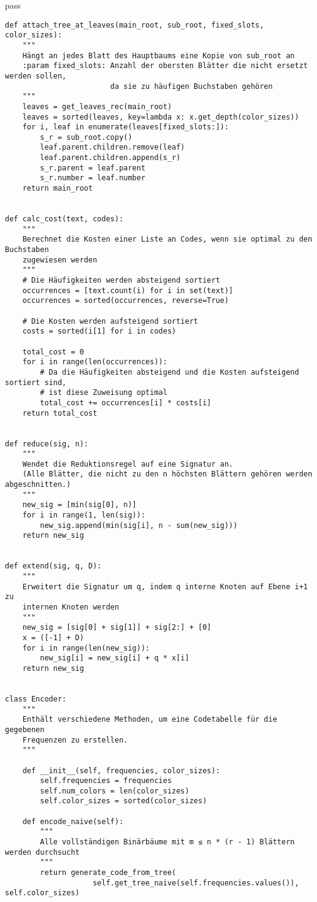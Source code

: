 pass\documentclass[a4paper,10pt,ngerman]{scrartcl}
\begin{document}
\begin{verbatim}
def attach_tree_at_leaves(main_root, sub_root, fixed_slots, color_sizes):
    """
    Hängt an jedes Blatt des Hauptbaums eine Kopie von sub_root an
    :param fixed_slots: Anzahl der obersten Blätter die nicht ersetzt werden sollen,
                        da sie zu häufigen Buchstaben gehören
    """
    leaves = get_leaves_rec(main_root)
    leaves = sorted(leaves, key=lambda x: x.get_depth(color_sizes))
    for i, leaf in enumerate(leaves[fixed_slots:]):
        s_r = sub_root.copy()
        leaf.parent.children.remove(leaf)
        leaf.parent.children.append(s_r)
        s_r.parent = leaf.parent
        s_r.number = leaf.number
    return main_root


def calc_cost(text, codes):
    """
    Berechnet die Kosten einer Liste an Codes, wenn sie optimal zu den Buchstaben
    zugewiesen werden
    """
    # Die Häufigkeiten werden absteigend sortiert
    occurrences = [text.count(i) for i in set(text)]
    occurrences = sorted(occurrences, reverse=True)

    # Die Kosten werden aufsteigend sortiert
    costs = sorted(i[1] for i in codes)

    total_cost = 0
    for i in range(len(occurrences)):
        # Da die Häufigkeiten absteigend und die Kosten aufsteigend sortiert sind,
        # ist diese Zuweisung optimal
        total_cost += occurrences[i] * costs[i]
    return total_cost


def reduce(sig, n):
    """
    Wendet die Reduktionsregel auf eine Signatur an.
    (Alle Blätter, die nicht zu den n höchsten Blättern gehören werden abgeschnitten.)
    """
    new_sig = [min(sig[0], n)]
    for i in range(1, len(sig)):
        new_sig.append(min(sig[i], n - sum(new_sig)))
    return new_sig


def extend(sig, q, D):
    """
    Erweitert die Signatur um q, indem q interne Knoten auf Ebene i+1 zu
    internen Knoten werden
    """
    new_sig = [sig[0] + sig[1]] + sig[2:] + [0]
    x = ([-1] + D)
    for i in range(len(new_sig)):
        new_sig[i] = new_sig[i] + q * x[i]
    return new_sig


class Encoder:
    """
    Enthält verschiedene Methoden, um eine Codetabelle für die gegebenen
    Frequenzen zu erstellen.
    """

    def __init__(self, frequencies, color_sizes):
        self.frequencies = frequencies
        self.num_colors = len(color_sizes)
        self.color_sizes = sorted(color_sizes)

    def encode_naive(self):
        """
        Alle vollständigen Binärbäume mit m ≤ n * (r - 1) Blättern werden durchsucht
        """
        return generate_code_from_tree(
                    self.get_tree_naive(self.frequencies.values()), self.color_sizes)


\end{verbatim}
\end{document}

